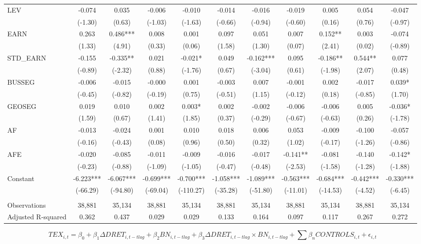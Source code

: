 \begin{table}[H]
\begin{center}
\begin{tabular}{lcccccccccc}
			LEV & -0.074 & 0.035 & -0.006 & -0.010 & -0.014 & -0.016 & -0.019 & 0.005 & 0.054 & -0.047 \\
			& (-1.30) & (0.63) & (-1.03) & (-1.63) & (-0.66) & (-0.94) & (-0.60) & (0.16) & (0.76) & (-0.97) \\
			EARN & 0.263 & 0.486*** & 0.008 & 0.001 & 0.097 & 0.051 & 0.007 & 0.152** & 0.003 & -0.074 \\
			& (1.33) & (4.91) & (0.33) & (0.06) & (1.58) & (1.30) & (0.07) & (2.41) & (0.02) & (-0.89) \\
			STD\_EARN & -0.155 & -0.335** & 0.021 & -0.021* & 0.049 & -0.162*** & 0.095 & -0.186** & 0.544** & 0.077 \\
			& (-0.89) & (-2.32) & (0.88) & (-1.76) & (0.67) & (-3.04) & (0.61) & (-1.98) & (2.07) & (0.48) \\
			BUSSEG & -0.006 & -0.015 & -0.000 & 0.001 & -0.003 & 0.007 & -0.001 & 0.002 & -0.017 & 0.039* \\
			& (-0.45) & (-0.82) & (-0.19) & (0.75) & (-0.51) & (1.15) & (-0.12) & (0.18) & (-0.85) & (1.70) \\
			GEOSEG & 0.019 & 0.010 & 0.002 & 0.003* & 0.002 & -0.002 & -0.006 & -0.006 & 0.005 & -0.036* \\
			& (1.59) & (0.67) & (1.41) & (1.85) & (0.37) & (-0.29) & (-0.67) & (-0.63) & (0.26) & (-1.78) \\
			AF & -0.013 & -0.024 & 0.001 & 0.010 & 0.018 & 0.006 & 0.053 & -0.009 & -0.100 & -0.057 \\
			& (-0.16) & (-0.43) & (0.08) & (0.96) & (0.50) & (0.32) & (1.02) & (-0.17) & (-1.26) & (-0.86) \\
			AFE & -0.020 & -0.085 & -0.011 & -0.009 & -0.016 & -0.017 & -0.141** & -0.081 & -0.140 & -0.142* \\
			& (-0.23) & (-0.88) & (-1.09) & (-1.05) & (-0.47) & (-0.48) & (-2.53) & (-1.58) & (-1.28) & (-1.88) \\
			Constant & -6.223*** & -6.067*** & -0.699*** & -0.700*** & -1.058*** & -1.089*** & -0.563*** & -0.684*** & -0.442*** & -0.330*** \\
			& (-66.29) & (-94.80) & (-69.04) & (-110.27) & (-35.28) & (-51.80) & (-11.01) & (-14.53) & (-4.52) & (-6.45) \\
			&   &   &   &   &   &   &   &   &   &  \\
			Observations & 38,881 & 35,134 & 38,881 & 35,134 & 38,881 & 35,134 & 38,881 & 35,134 & 38,881 & 35,134 \\
			Adjusted R-squared & 0.362 & 0.437 & 0.029 & 0.029 & 0.133 & 0.164 & 0.097 & 0.117 & 0.267 & 0.272 \\
			\bottomrule
			\bottomrule
		\end{tabular}%
	\end{center}
		\begin{footnotesize}
			\setcounter{equation}{0}
			\begin{equation}
				TEX_{i,t}=\beta_0+\beta_1\Delta DRET_{i,t-tlag}+\beta_2BN_{i,t-tlag}+\beta_3\Delta DRET_{i,t-tlag}\times 	BN_{i,t-tlag}+\sum\beta_nCONTROLS_{i,t}+\epsilon_{i,t}
			\end{equation}
			

\end{footnotesize}
\end{table}
